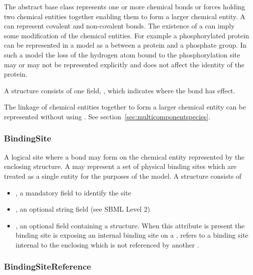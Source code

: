 \documentclass{cekarticle}
\begin{document}
The abstract base class  represents one or more chemical bonds or forces holding two chemical
entities together enabling them to form a larger chemical entity.  A  can represent
covalent and non-covalent bonds.  The existence of a  can imply some
modification of the chemical entities.  For example a phosphorylated protein can be represented
in a model as a  between a protein and a phosphate group.  In such a model
the loss of the hydrogen atom bound to the phosphorylation site may or may not be represented
explicitly and does not affect the identity of the protein.  

A  structure consists of one  field,
, which indicates where the bond has effect.

The linkage of chemical entities together to form a larger chemical entity can be 
represented without using .  See section~\ref{sec:multicomponentspecies}.

\subsubsection{BindingSite}

A logical site where a bond may form on the chemical entity represented by the
enclosing  structure.  A  may represent a set of
physical binding sites which are treated as a single entity for the purposes of the model.  
A  structure consists of

\begin{itemize}

\item {}, a mandatory  field to identify the site

\item {}, an optional string field (see SBML Level 2)

\item {}, an optional field containing a
 structure.  When this attribute is present the binding site is
exposing an internal binding site on a .
 refers to a binding site internal to the enclosing
 which is not referenced by another .

\end{itemize}

\subsubsection{BindingSiteReference}
\end{document}
